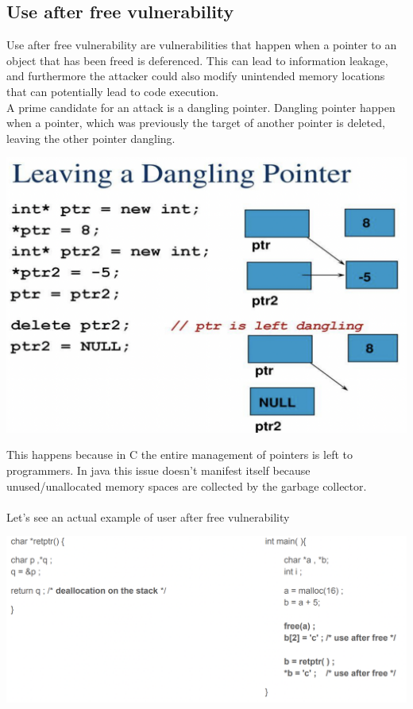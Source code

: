 \documentclass[11pt, oneside]{article}   	%
\begin{document}
\subsection*{Use after free vulnerability}
Use after free vulnerability are vulnerabilities that happen when a pointer to an object that has been freed is deferenced. This can lead to information leakage, and furthermore the attacker could also modify unintended memory locations that can potentially lead to code execution.\\
A prime candidate for an attack is a dangling pointer. Dangling pointer happen when a pointer, which was previously the target of another pointer is deleted, leaving the other pointer dangling.\\
\begin{center}
\includegraphics[scale = 0.6]{dpointer}
\end{center}
This happens because in C the entire management of pointers is left to programmers. In java this issue doesn't manifest itself because unused/unallocated memory spaces are collected by the garbage collector.\\\\
Let's see an actual example of user after free vulnerability
\begin{center}
\includegraphics[scale = 0.6]{usafter}
\end{center}
\end{document}
